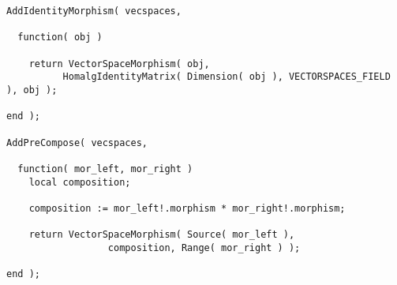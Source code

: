 \begin{small}
\begin{Verbatim}[frame=single]
AddIdentityMorphism( vecspaces,
                     
  function( obj )

    return VectorSpaceMorphism( obj,
          HomalgIdentityMatrix( Dimension( obj ), VECTORSPACES_FIELD ), obj );
    
end );

AddPreCompose( vecspaces,

  function( mor_left, mor_right )
    local composition;

    composition := mor_left!.morphism * mor_right!.morphism;

    return VectorSpaceMorphism( Source( mor_left ),
                  composition, Range( mor_right ) );

end );
\end{Verbatim}
\end{small}